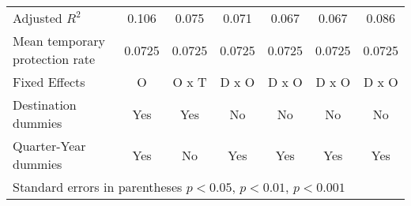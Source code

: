 \begin{table}[!ht]
\begin{tabular}{l*{6}{c}}
Adjusted \(R^{2}\)  &       0.106         &       0.075         &       0.071         &       0.067         &       0.067         &       0.086         \\
Mean temporary protection rate&      0.0725         &      0.0725         &      0.0725         &      0.0725         &      0.0725         &      0.0725         \\
Fixed Effects       &           O         &       O x T         &       D x O         &       D x O         &       D x O         &       D x O         \\
Destination dummies &         Yes         &         Yes         &          No         &          No         &          No         &          No         \\
Quarter-Year dummies&         Yes         &          No         &         Yes         &         Yes         &         Yes         &         Yes         \\
\hline\hline
\multicolumn{7}{l}{ Standard errors in parentheses \sym{*} \(p<0.05\), \sym{**} \(p<0.01\), \sym{***} \(p<0.001\)}\\
\end{tabular}
\end{table}
